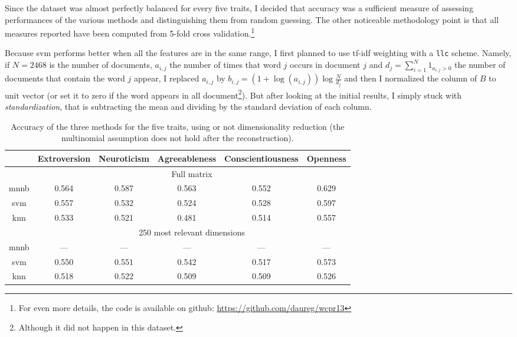 Since the dataset was almost perfectly balanced for every five traits, I decided that accuracy was a sufficient measure of assessing performances of the various methods and distinguishing them from random guessing. The other noticeable methodology point is that all measures reported have been computed from 5-fold cross validation.\footnote{For even more details, the code is available on github: \href{https://github.com/daureg/wcpr13}{https://github.com/daureg/wcpr13}}

Because \gls{svm} performs better when all the features are in the same range, I first planned to use tf-idf weighting with a \texttt{llc} scheme. Namely, if $N=2468$ is the number of documents, $a_{i,j}$ the number of times that word $j$ occurs in document $j$ and $d_j = \sum_{i=1}^N 1_{a_{i,j}>0}$ the number of documents that contain the word $j$ appear, I replaced $a_{i,j}$ by $b_{i,j} = (1+\log(a_{i,j}))\log\frac{N}{d_j}$ and then I normalized the column of $B$ to unit vector (or set it to zero if the word appears in all document\footnote{Although it did not happen in this dataset.}). But after looking at the initial results, I simply stuck with \emph{standardization}, that is subtracting the mean and dividing by the standard deviation of each column.

\begin{table}[hb]
	\begin{adjustwidth}{-2pt}{-2pt}
	\centering
	\begin{tabular}{cccccc}
		\toprule
		& Extroversion & Neuroticism & Agreeableness & Conscientiousness & Openness \tabularnewline
		\midrule
		& \multicolumn{5}{c}{Full matrix} \tabularnewline
		\cmidrule(r){2-6}
		\gls{mnnb} & 0.564 & 0.587 & 0.563 & 0.552 & 0.629 \tabularnewline
   		\gls{svm} & 0.557 & 0.532 & 0.524 & 0.528 & 0.597 \tabularnewline
   		\gls{knn} & 0.533 & 0.521 & 0.481 & 0.514 & 0.557 \tabularnewline
		& \multicolumn{5}{c}{250 most relevant dimensions} \tabularnewline
		\cmidrule(r){2-6}
		\gls{mnnb} & --- & --- & --- & --- & --- \tabularnewline
   		\gls{svm} & 0.550 & 0.551 & 0.542 & 0.517 & 0.573 \tabularnewline
   		\gls{knn} & 0.518 & 0.522 & 0.509 & 0.509 & 0.526 \tabularnewline
		\bottomrule
	\end{tabular}
	\end{adjustwidth}
	\caption{Accuracy of the three methods for the five traits, using or not dimensionality reduction (the multinomial assumption does not hold after the  reconstruction).}
	\label{tab:res}
\end{table}

